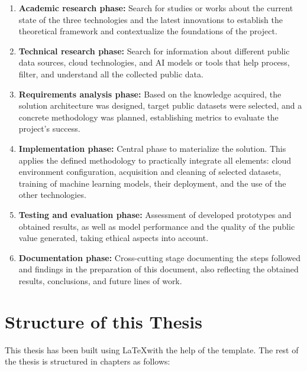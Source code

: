 \begin{enumerate}
	
	\item \textbf{Academic research phase:} Search for studies or works about the current state of the three technologies and the latest innovations to establish the theoretical framework and contextualize the foundations of the project.
	
	\item \textbf{Technical research phase:} Search for information about different public data sources, cloud technologies, and AI models or tools that help process, filter, and understand all the collected public data.
	
	\item \textbf{Requirements analysis phase:} Based on the knowledge acquired, the solution architecture was designed, target public datasets were selected, and a concrete methodology was planned, establishing metrics to evaluate the project's success.
	
	\item \textbf{Implementation phase:} Central phase to materialize the solution. This applies the defined methodology to practically integrate all elements: cloud environment configuration, acquisition and cleaning of selected datasets, training of machine learning models, their deployment, and the use of the other technologies.
	
	\item \textbf{Testing and evaluation phase:} Assessment of developed prototypes and obtained results, as well as model performance and the quality of the public value generated, taking ethical aspects into account.
	
	\item \textbf{Documentation phase:} Cross-cutting stage documenting the steps followed and findings in the preparation of this document, also reflecting the obtained results, conclusions, and future lines of work.
	
	
\end{enumerate}

\section{Structure of this Thesis}

This thesis has been built using \LaTeX\space [\ref{latexDef}] with the help of the \texis\space template. The rest of the thesis is structured in chapters as follows:

